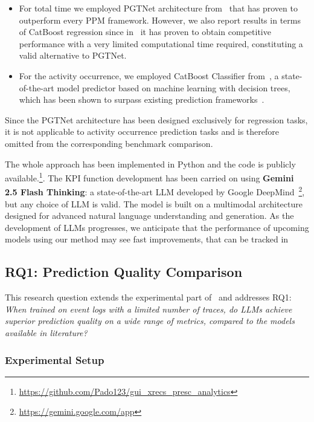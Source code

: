 \documentclass[manuscript,screen,review]{acmart}
\begin{document}
\begin{itemize}

\item For total time we employed PGTNet architecture from~\cite{DBLP:conf/caise/ElyasiAS24} that has proven to outperform every PPM framework. However, we also report results in terms of CatBoost regression since in~\cite{galanti2020explainable} it has proven to obtain competitive performance with a very limited computational time required, constituting a valid alternative to PGTNet.

\item For the activity occurrence, we employed CatBoost Classifier from~\cite{CatBoost}, a state-of-the-art model predictor based on machine learning with decision trees, which has been shown to surpass existing prediction frameworks~\cite{galanti2020explainable}.

\end{itemize}

Since the PGTNet architecture has been designed exclusively for regression tasks, it is not applicable to activity occurrence prediction tasks and is therefore omitted from the corresponding benchmark comparison.

The whole approach has been implemented in Python and the code is publicly available.\footnote{\url{https://github.com/Pado123/gui_xrecs_presc_analytics}}. The KPI function development has been carried on using \textbf{Gemini 2.5 Flash Thinking}: a state-of-the-art LLM developed by Google DeepMind~\footnote{\url{https://gemini.google.com/app}}, but any choice of LLM is valid. The model is built on a multimodal architecture designed for advanced natural language understanding and generation. As the development of LLMs progresses, we anticipate that the performance of upcoming models using our method may see fast improvements, that can be tracked in~\cite{llms_leaderboard}

\subsection{RQ1: Prediction Quality Comparison}\label{subsec:rq1}
This research question extends the experimental part of~\cite{10.1007/978-3-032-02929-4_16} and addresses RQ1: \textit{When trained on event logs with a limited number of traces, do LLMs achieve superior prediction quality on a wide range of metrics, compared to the models available in literature?}

\subsubsection{Experimental Setup}
\end{document}
